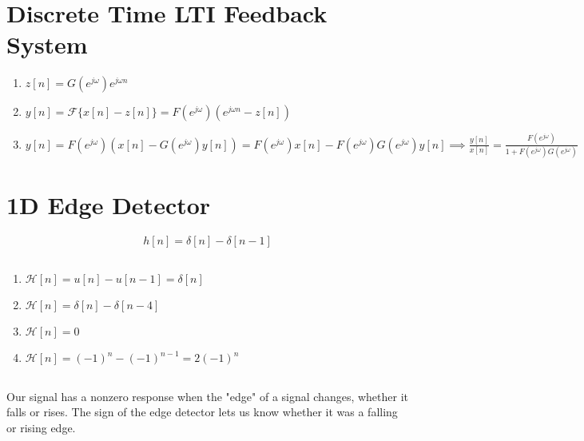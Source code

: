 \documentclass{article}
\renewcommand{\labelenumi}{\arabic{enumi}.}
\begin{document}
\section{Discrete Time LTI Feedback System}

\begin{enumerate}
    \item \(z[n] = G(e^{j \omega}) e^{j \omega n}\)
    \item \(y[n] = \mathcal{F}\{x[n] - z[n]\} = F(e^{j \omega}) (e^{j \omega n} - z[n])\)
    \item \(y[n] = F(e^{j \omega}) (x[n] - G(e^{j \omega}) y[n]) = F(e^{j \omega}) x[n] - F(e^{j \omega}) G(e^{j \omega}) y[n] \implies \frac{y[n]}{x[n]} = \frac{F(e^{j \omega})}{1 + F(e^{j \omega}) G(e^{j \omega})}\)
\end{enumerate}

\subsection{}

\section{1D Edge Detector}

\begin{equation}
    h[n] = \delta[n] - \delta[n - 1]
\end{equation}

\subsection{}

\renewcommand{\labelenumi}{\alph{enumi}.}
\begin{enumerate}
    \item \(\mathcal{H}[n] = u[n] - u[n - 1] = \delta[n]\)
    \item \(\mathcal{H}[n] = \delta[n] - \delta[n - 4]\)
    \item \(\mathcal{H}[n] = 0\)
    \item \(\mathcal{H}[n] = (-1)^n - (-1)^{n - 1} = 2(-1)^n\)
\end{enumerate}

\subsection{}

Our signal has a nonzero response when the "edge" of a signal changes, whether it falls or rises.
The sign of the edge detector lets us know whether it was a falling or rising edge.
\end{document}
